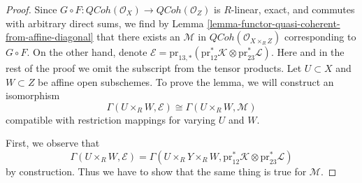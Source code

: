 \documentclass[10pt,a4paper]{amsart}
\theoremstyle{plain}
\theoremstyle{definition}
\theoremstyle{remark}
\numberwithin{equation}{subsection}
\def\QCoh{\mathit{QCoh}}
\begin{document}
\begin{proof}
Since $G \circ F : \QCoh(\mathcal{O}_X) \to \QCoh(\mathcal{O}_Z)$
is $R$-linear, exact, and commutes with arbitrary direct sums,
we find by Lemma \ref{lemma-functor-quasi-coherent-from-affine-diagonal}
that there exists an $\mathcal{M}$ in
$\QCoh(\mathcal{O}_{X \times_R Z})$ corresponding to $G \circ F$.
On the other hand, denote
$\mathcal{E} = \text{pr}_{13, *}(\text{pr}_{12}^*\mathcal{K}
\otimes \text{pr}_{23}^*\mathcal{L})$. Here and in the rest of
the proof we omit the subscript from the tensor products.
Let $U \subset X$ and $W \subset Z$ be affine open subschemes.
To prove the lemma, we will construct an isomorphism
$$
\Gamma(U \times_R W, \mathcal{E})
\cong
\Gamma(U \times_R W, \mathcal{M})
$$
compatible with restriction mappings for varying $U$ and $W$.

\medskip\noindent
First, we observe that
$$
\Gamma(U \times_R W, \mathcal{E}) =
\Gamma(U \times_R Y \times_R W,
\text{pr}_{12}^*\mathcal{K} \otimes \text{pr}_{23}^*\mathcal{L})
$$
by construction. Thus we have to show that the same thing is true
for $\mathcal{M}$.


\end{proof}
\end{document}

